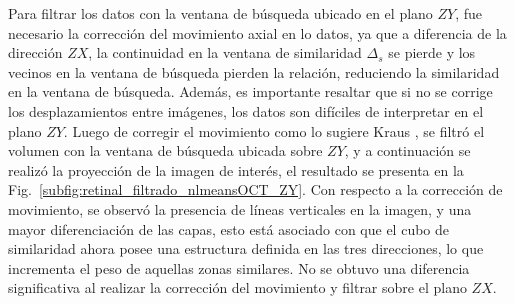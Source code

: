 Para filtrar los datos con la ventana de búsqueda ubicado en el plano $ZY$, fue necesario la corrección del movimiento axial en lo datos, ya que a diferencia de la dirección $ZX$, la continuidad en la ventana de similaridad $\Delta_s$ se pierde y los vecinos en la ventana de búsqueda pierden la relación, reduciendo la similaridad en la ventana de búsqueda. Además, es importante resaltar que si no se corrige los desplazamientos entre imágenes, los datos son difíciles de interpretar en el plano $ZY$. Luego de corregir el movimiento como lo sugiere Kraus \etal \cite{Kraus2012}, se filtró el volumen con la ventana de búsqueda ubicada sobre $ZY$, y a continuación se realizó la proyección de la imagen de interés, el resultado se presenta en la Fig.~\ref{subfig:retinal_filtrado_nlmeansOCT_ZY}. Con respecto a la corrección de movimiento, se observó la presencia de líneas verticales en la imagen, y una mayor diferenciación de las capas, esto está asociado con que el cubo de similaridad ahora posee una estructura definida en las tres direcciones, lo que incrementa el peso de aquellas zonas similares. No se obtuvo una diferencia significativa al realizar la corrección del movimiento y filtrar sobre el plano $ZX$. %

